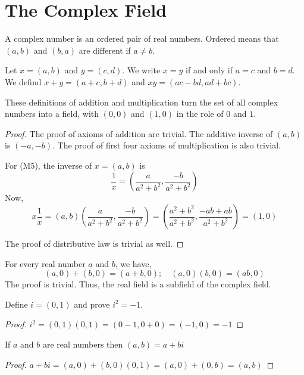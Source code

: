 \pagebreak

\section{The Complex Field}

\begin{defn}
	A complex number is an ordered pair of real numbers.
	Ordered means that $(a, b)$ and $(b, a)$ are different if $a \neq b$.

	Let $x = (a, b)$ and $y = (c, d)$. We write $x = y$ if and only if $a = c$ and $b = d$.
	We defind $x + y = (a + c, b + d)$ and $xy = (ac - bd, ad + bc)$.
\end{defn}

\begin{thm}
	These definitions of addition and multiplication turn the set of all complex numbers into a field,
	with $(0, 0)$ and $(1, 0)$ in the role of $0$ and $1$.
	\begin{proof}
		The proof of axioms of addition are trivial. The additive inverse of $(a, b)$ is $(-a, -b)$.
		The proof of first four axioms of multiplication is also trivial.

		For (M5), the inverse of $x = (a, b)$ is $$ \frac{1}{x} = \left( \frac{a}{a^2 + b^2}, \frac{-b}{a^2 + b^2} \right) $$
		Now, $$ x \frac{1}{x} = (a, b) \left( \frac{a}{a^2 + b^2}, \frac{-b}{a^2 + b^2} \right)
					= \left( \frac{a^2 + b^2}{a^2 + b^2}, \frac{-ab + ab}{a^2 + b^2} \right) = (1, 0) $$

		The proof of distributive law is trivial as well.
	\end{proof}
\end{thm}

\begin{thm}
	For every real number $a$ and $b$, we have,
	$$ (a, 0) + (b, 0) = (a + b, 0) ; \quad (a, 0) (b, 0) = (ab, 0) $$
	The proof is trivial. Thus, the real field is a subfield of the complex field.
\end{thm}

\begin{thm}
	Define $i = (0, 1)$ and prove $i^2 = -1$.
	\begin{proof}
		$i^2 = (0, 1) (0, 1) = (0 - 1, 0 + 0) = (-1, 0) = -1$
	\end{proof}
\end{thm}

\begin{thm}
	If $a$ and $b$ are real numbers then $(a, b) = a + bi$
	\begin{proof}
		$a + bi = (a, 0) + (b, 0)(0, 1) = (a, 0) + (0, b) = (a, b)$
	\end{proof}
\end{thm}

